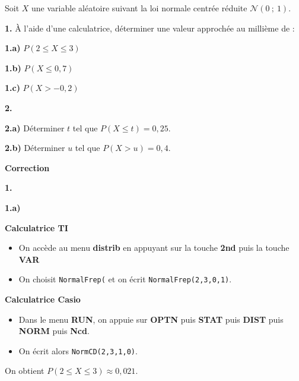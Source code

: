 \documentclass{cornouaille}
\begin{document}
\begin{methode}

\exercice

Soit $X$ une variable aléatoire suivant la loi normale centrée réduite $\mathcal{N}(0\ ;\ 1)$.




\textbf{1. } \`A l'aide d'une calculatrice, déterminer une valeur approchée au millième de :




\textbf{1.a) } $P(2\leqslant X\leqslant 3)$


\textbf{1.b) } $P(X\leqslant 0,7)$


\textbf{1.c) } $P(X>-0,2)$




\textbf{2. }




\textbf{2.a) } Déterminer $t$ tel que $P(X\leqslant t)=0,25$.


\textbf{2.b) } Déterminer $u$ tel que $P(X>u)=0,4$.





\textbf{Correction}




\textbf{1. } 



\textbf{1.a) } 

\textcolor{H1}{\bfseries Calculatrice TI}

\begin{itemize}
\item On accède au menu \textbf{distrib} en appuyant sur la touche \textbf{2nd}
puis la touche \textbf{VAR}
\item On choisit \verb"NormalFrep(" et on écrit \verb"NormalFrep(2,3,0,1)".
\end{itemize}
\columnbreak


\textcolor{H1}{\bfseries Calculatrice Casio}

\begin{itemize}
\item Dans le menu \textbf{RUN}, on appuie sur \textbf{OPTN}
puis \textbf{STAT} puis \textbf{DIST} puis \textbf{NORM} puis \textbf{Ncd}.
\item On écrit alors \verb"NormCD(2,3,1,0)".
\end{itemize}



On obtient  $P(2\leqslant X\leqslant 3)\approx0,021$.



\end{methode}
\end{document}
